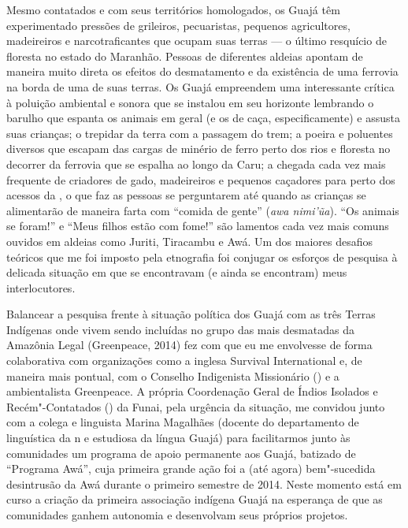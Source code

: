 Mesmo contatados e com seus territórios homologados, os Guajá têm
experimentado pressões de grileiros, pecuaristas, pequenos agricultores,
madeireiros e narcotraficantes que ocupam suas terras --- o último
resquício de floresta no estado do Maranhão. Pessoas de diferentes
aldeias apontam de maneira muito direta os efeitos do desmatamento e da
existência de uma ferrovia na borda de uma de suas terras. Os Guajá
empreendem uma interessante crítica à poluição ambiental e sonora que se
instalou em seu horizonte lembrando o barulho que espanta os animais em
geral (e os de caça, especificamente) e assusta suas crianças; o
trepidar da terra com a passagem do trem; a poeira e poluentes diversos
que escapam das cargas de minério de ferro perto dos rios e floresta no
decorrer da ferrovia que se espalha ao longo da  Caru; a chegada cada
vez mais frequente de criadores de gado, madeireiros e pequenos
caçadores para perto dos acessos da , o que faz as pessoas se
perguntarem até quando as crianças se alimentarão de maneira farta com
``comida de gente'' (\emph{awa nimi'ũa}). ``Os animais se foram!'' e
``Meus filhos estão com fome!'' são lamentos cada vez mais comuns
ouvidos em aldeias como Juriti, Tiracambu e Awá. Um dos maiores desafios
teóricos que me foi imposto pela etnografia foi conjugar os esforços de
pesquisa à delicada situação em que se encontravam (e ainda se
encontram) meus interlocutores.

Balancear a pesquisa frente à situação política dos Guajá com as três
Terras Indígenas onde vivem sendo incluídas no grupo das mais desmatadas
da Amazônia Legal (Greenpeace, 2014) fez com que eu me envolvesse de
forma colaborativa com organizações como a  inglesa Survival
International e, de maneira mais pontual, com o Conselho Indigenista
Missionário () e a  ambientalista Greenpeace. A própria
Coordenação Geral de Índios Isolados e Recém"-Contatados () da
Funai, pela urgência da situação, me convidou junto com a colega e
linguista Marina Magalhães (docente do departamento de linguística da
n e estudiosa da língua Guajá) para facilitarmos junto às comunidades
um programa de apoio permanente aos Guajá, batizado de ``Programa Awá'',
cuja primeira grande ação foi a (até agora) bem"-sucedida desintrusão da
 Awá durante o primeiro semestre de 2014. Neste momento está em curso
a criação da primeira associação indígena Guajá na esperança de que as
comunidades ganhem autonomia e desenvolvam seus próprios projetos.


